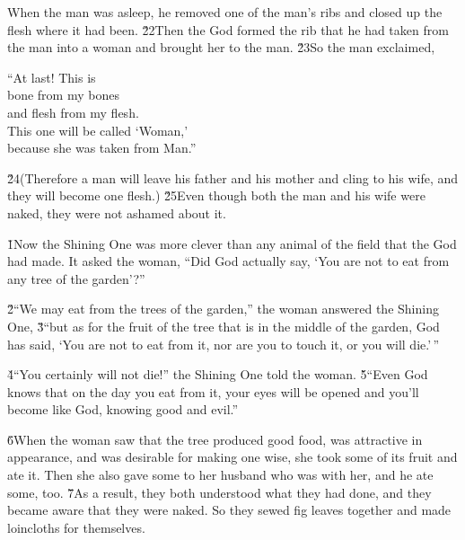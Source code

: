 When the man was asleep, he removed one of the man's ribs and closed up the flesh where it had been. \v{22}Then the  God formed the rib that he had taken from the man into a woman and brought her to the man. \v{23}So the man exclaimed,

\begin{poetry}
\poeml ``At last! This is \\
\poemll    bone from my bones \\
\poemlll       and flesh from my flesh. \\
\poeml This one will be called `Woman,' \\
\poemll    because she was taken from Man.''
\end{poetry}

\v{24}(Therefore a man will leave his father and his mother and cling to his wife, and they will become one flesh.) \v{25}Even though both the man and his wife were naked, they were not ashamed about it.

\v{1}Now the Shining One was more clever than any animal of the field that the  God had made. It asked the woman, ``Did God actually say, `You are not to eat from any tree of the garden'?''

\v{2}``We may eat from the trees of the garden,'' the woman answered the Shining One, \v{3}``but as for the fruit of the tree that is in the middle of the garden, God has said, `You are not to eat from it, nor are you to touch it, or you will die.'\,''

\v{4}``You certainly will not die!'' the Shining One told the woman. \v{5}``Even God knows that on the day you eat from it, your eyes will be opened and you'll become like God, knowing good and evil.''

\v{6}When the woman saw that the tree produced good food, was attractive in appearance, and was desirable for making one wise, she took some of its fruit and ate it. Then she also gave some to her husband who was with her, and he ate some, too. \v{7}As a result, they both understood what they had done, and they became aware that they were naked. So they sewed fig leaves together and made loincloths for themselves.

